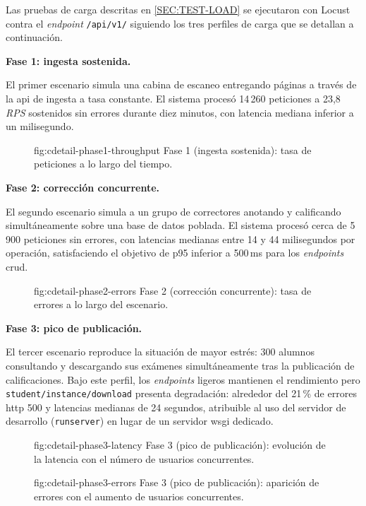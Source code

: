 Las pruebas de carga descritas en \cref{SEC:TEST-LOAD} se ejecutaron
con Locust contra el \textit{endpoint} \texttt{/api/v1/} siguiendo los
tres perfiles de carga que se detallan a continuación.

\bigskip\noindent\textbf{Fase 1: ingesta sostenida.}

El primer escenario simula una cabina de escaneo entregando páginas a
través de la \acs{api} de ingesta a tasa constante. El sistema procesó
14\,260 peticiones a 23,8 \textit{RPS} sostenidos sin errores durante
diez minutos, con latencia mediana inferior a un milisegundo.

\begin{figure}[Fase 1: throughput sostenido]%
              {fig:cdetail-phase1-throughput}%
              {Fase 1 (ingesta sostenida): tasa de peticiones a lo
               largo del tiempo.}
\end{figure}

\bigskip\noindent\textbf{Fase 2: corrección concurrente.}

El segundo escenario simula a un grupo de correctores anotando y
calificando simultáneamente sobre una base de datos poblada. El sistema
procesó cerca de 5\,900 peticiones sin errores, con latencias medianas
entre 14 y 44 milisegundos por operación, satisfaciendo el objetivo de
p95 inferior a 500\,ms para los \textit{endpoints} \acs{crud}.

\begin{figure}[Fase 2: tasa de errores]%
              {fig:cdetail-phase2-errors}%
              {Fase 2 (corrección concurrente): tasa de errores a lo
               largo del escenario.}
\end{figure}

\bigskip\noindent\textbf{Fase 3: pico de publicación.}

El tercer escenario reproduce la situación de mayor estrés:
300 alumnos consultando y descargando sus exámenes simultáneamente
tras la publicación de calificaciones. Bajo este perfil, los
\textit{endpoints} ligeros mantienen el rendimiento pero
\texttt{student/instance/download} presenta degradación: alrededor del
21\,\% de errores \acs{http} 500 y latencias medianas de 24 segundos,
atribuible al uso del servidor de desarrollo (\texttt{runserver}) en
lugar de un servidor \acs{wsgi} dedicado.

\begin{figure}[Fase 3: latencia frente a usuarios concurrentes]%
              {fig:cdetail-phase3-latency}%
              {Fase 3 (pico de publicación): evolución de la latencia
               con el número de usuarios concurrentes.}
\end{figure}

\begin{figure}[Fase 3: errores frente a usuarios concurrentes]%
              {fig:cdetail-phase3-errors}%
              {Fase 3 (pico de publicación): aparición de errores con
               el aumento de usuarios concurrentes.}
\end{figure}
